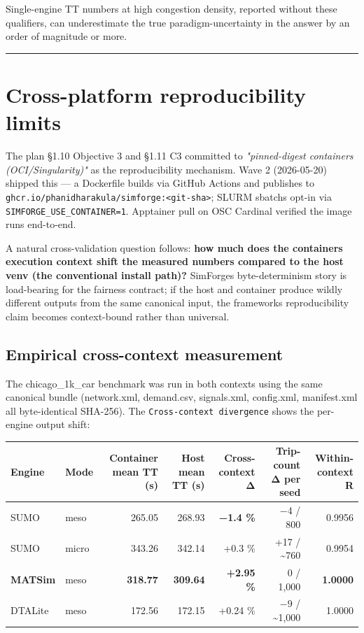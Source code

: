 Single-engine TT numbers at high congestion density, reported without
these qualifiers, can underestimate the true paradigm-uncertainty in the
answer by an order of magnitude or more.

\begin{center}\rule{0.5\linewidth}{0.5pt}\end{center}

\section{Cross-platform reproducibility
limits}\label{563-cross-platform-reproducibility-limits}

The plan §1.10 Objective 3 and §1.11 C3 committed to
\emph{"pinned-digest containers (OCI/Singularity)"} as the
reproducibility mechanism. Wave 2 (2026-05-20) shipped this --- a
Dockerfile builds via GitHub Actions and publishes to
\texttt{ghcr.io/phanidharakula/simforge:\textless{}git-sha\textgreater{}};
SLURM sbatchs opt-in via \texttt{SIMFORGE\_USE\_CONTAINER=1}. Apptainer
pull on OSC Cardinal verified the image runs end-to-end.

A natural cross-validation question follows: \textbf{how much does the
container\textquotesingle s execution context shift the measured numbers
compared to the host venv (the conventional install path)?}
SimForge\textquotesingle s byte-determinism story is load-bearing for
the fairness contract; if the host and container produce wildly
different outputs from the same canonical input, the
framework\textquotesingle s reproducibility claim becomes context-bound
rather than universal.

\subsection{Empirical cross-context
measurement}\label{empirical-cross-context-measurement}

The chicago\_1k\_car benchmark was run in both contexts using the same
canonical bundle (network.xml, demand.csv, signals.xml, config.xml,
manifest.xml all byte-identical SHA-256). The
\texttt{Cross-context\ divergence} shows the per-engine output shift:

\begin{longtable}[]{@{}llrrrrr@{}}
\toprule\noalign{}
Engine & Mode & Container mean TT (s) & Host mean TT (s) & Cross-context
Δ & Trip-count Δ per seed & Within-context R \\
\midrule\noalign{}
\endhead
\bottomrule\noalign{}
\endlastfoot
SUMO & meso & 265.05 & 268.93 & \textbf{−1.4 \%} & −4 / 800 & 0.9956 \\
SUMO & micro & 343.26 & 342.14 & +0.3 \% & +17 / \textasciitilde760 &
0.9954 \\
\textbf{MATSim} & meso & \textbf{318.77} & \textbf{309.64} &
\textbf{+2.95 \%} & 0 / 1,000 & \textbf{1.0000} \\
DTALite & meso & 172.56 & 172.15 & +0.24 \% & −9 / \textasciitilde1,000
& 1.0000 \\
\end{longtable}

